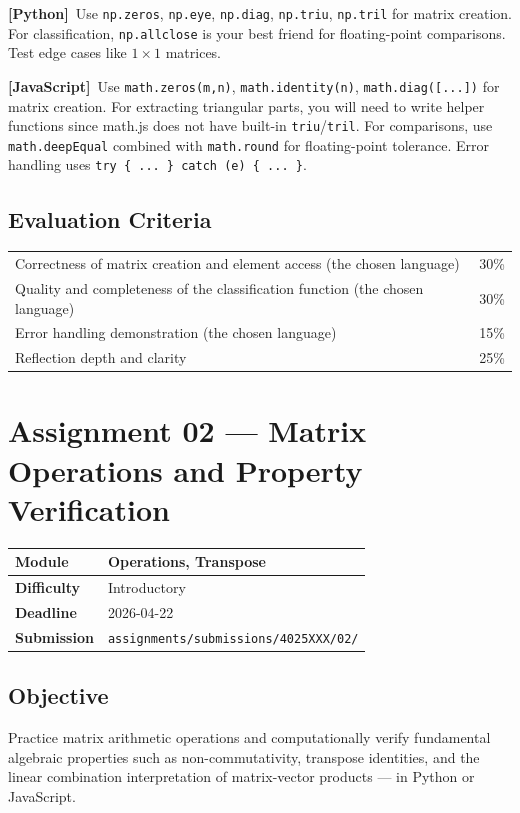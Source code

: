\documentclass[a4paper,11pt]{article}
\newcommand{\assignmentmeta}[4]{%
  \noindent
  \begin{tabularx}{\textwidth}{
    >{\bfseries\color{ippblue}\cellcolor{lightblue}}p{3cm}
    X}
    \arrayrulecolor{gray!40}\hline
    Module     & #1 \\ \hline
    Difficulty & #2 \\ \hline
    Deadline   & #3 \\ \hline
    Submission & \texttt{assignments/submissions/4025XXX/#4/} \\ \hline
  \end{tabularx}
  \vspace{0.8em}
}
\newcommand{\pylabel}{\textcolor{pyborder}{\textbf{[Python]}}}
\newcommand{\jslabel}{\textcolor{jsborder}{\textbf{[JavaScript]}}}
\begin{document}
\begin{hintbox}
  \pylabel\ Use \texttt{np.zeros}, \texttt{np.eye}, \texttt{np.diag}, \texttt{np.triu}, \texttt{np.tril} for matrix creation. For classification, \texttt{np.allclose} is your best friend for floating-point comparisons. Test edge cases like $1 \times 1$ matrices.

  \medskip

  \jslabel\ Use \texttt{math.zeros(m,n)}, \texttt{math.identity(n)}, \texttt{math.diag([...])} for matrix creation. For extracting triangular parts, you will need to write helper functions since math.js does not have built-in \texttt{triu}/\texttt{tril}. For comparisons, use \texttt{math.deepEqual} combined with \texttt{math.round} for floating-point tolerance. Error handling uses \texttt{try \{ ... \} catch (e) \{ ... \}}.
\end{hintbox}

\subsection{Evaluation Criteria}

\begin{tabularx}{\textwidth}{X r}
  Correctness of matrix creation and element access (the chosen language) & 30\% \\
  Quality and completeness of the classification function (the chosen language) & 30\% \\
  Error handling demonstration (the chosen language) & 15\% \\
  Reflection depth and clarity & 25\% \\
\end{tabularx}

\newpage

\section{Assignment 02 --- Matrix Operations and Property Verification}

\assignmentmeta{Operations, Transpose}{Introductory}{2026-04-22}{02}

\subsection{Objective}

Practice matrix arithmetic operations and computationally verify fundamental algebraic properties such as non-commutativity, transpose identities, and the linear combination interpretation of matrix-vector products --- in Python or JavaScript.
\end{document}
